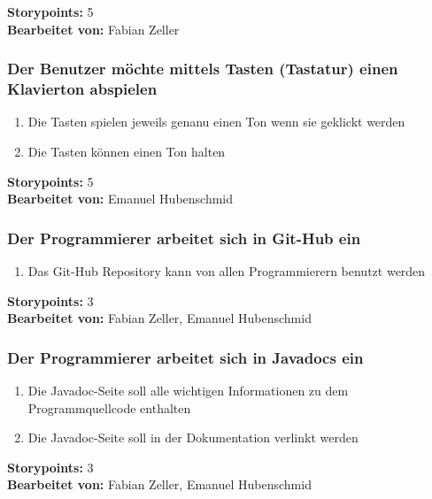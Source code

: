 \textbf{Storypoints:} 5 \\
\textbf{Bearbeitet von: } Fabian Zeller \\


\subsubsection{Der Benutzer möchte mittels Tasten (Tastatur) einen Klavierton abspielen}

\begin{enumerate}
 \item Die Tasten spielen jeweils genanu einen Ton wenn sie geklickt werden
 \item Die Tasten können einen Ton halten
\end{enumerate}

\textbf{Storypoints:} 5 \\
\textbf{Bearbeitet von: } Emanuel Hubenschmid \\


\subsubsection{Der Programmierer arbeitet sich in Git-Hub ein}

\begin{enumerate}
 \item Das Git-Hub Repository kann von allen Programmierern benutzt werden
\end{enumerate}

\textbf{Storypoints:} 3 \\
\textbf{Bearbeitet von: } Fabian Zeller, Emanuel Hubenschmid \\

\subsubsection{Der Programmierer arbeitet sich in Javadocs ein}

\begin{enumerate}
 \item Die Javadoc-Seite soll alle wichtigen Informationen zu dem Programmquellcode enthalten
 \item Die Javadoc-Seite soll in der Dokumentation verlinkt werden
\end{enumerate}

\textbf{Storypoints:} 3 \\
\textbf{Bearbeitet von: } Fabian Zeller, Emanuel Hubenschmid \\


